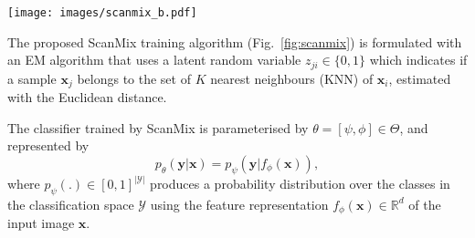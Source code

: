\documentclass[review]{elsarticle}
\theoremstyle{plain}
\begin{document}
\begin{figure*}
\centering
  \texttt{[image: images/scanmix\_b.pdf]}
  \caption{ScanMix has a pre-training stage consisting of a self-supervised training~\citep{SimCLR,MoCo,MoCoV2,SCAN}, where we use contrastive loss to approximate features to its data augmented variants, in the feature space, while repelling representations from negative examples. In the training stage we first warm-up the classifier using a simple classification loss.  Then, using the classification loss, we train the GMM to separate the samples into a clean set $\mathcal{X}$ and a noisy set $\mathcal{U}$ that are "MixMatched"~\citep{MixMatch} for SSL training.  In parallel to this SSL training, we use the classification results and feature representations to train the semantic clustering.  Please see  Algorithm~\ref{alg:SM} for more details.}
  \label{fig:scanmix}
\end{figure*}


The proposed ScanMix training algorithm (Fig.~\ref{fig:scanmix}) is formulated with an EM algorithm that uses a latent random variable $z_{ji} \in \{0,1\}$ which indicates if a sample $\mathbf{x}_j$ belongs to the set of $K$ nearest neighbours (KNN) of $\mathbf{x}_i$, estimated with the Euclidean distance.

The classifier trained by ScanMix is parameterised by $\theta = [ \psi, \phi ] \in \Theta$, and represented by
\begin{equation}
p_{\theta}(\mathbf{y}|\mathbf{x}) = p_{\psi}(\mathbf{y} | f_{\phi}(\mathbf{x})),
\label{eq:classifier}    
\end{equation}
where $p_{\psi}(.) \in [0,1]^{|\mathcal{Y}|}$ produces a probability distribution over the classes in the classification space $\mathcal{Y}$ using the feature representation $f_{\phi}(\mathbf{x}) \in \mathbb{R}^d$ of the input image $\mathbf{x}$.
\end{document}
